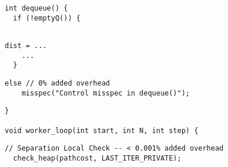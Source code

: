 

\begin{lstlisting}[morekeywords={pathcost,dist}, belowskip=0pt,
firstnumber=9, name=dij_checks, showlines=true]
int dequeue() {
  if (!emptyQ()) {


\end{lstlisting}

\begin{lstlisting}[morekeywords={pathcost,dist}, aboveskip=0pt, belowskip=0pt,
firstnumber=13, name=dij_checks]
    dist = ...
    ...
  }
\end{lstlisting}

  \begin{lstlisting}[morekeywords={pathcost}, aboveskip=0pt,belowskip=0pt,backgroundcolor=\color{lightgray}, firstnumber=auto, name=dij_checks]
  else // 0% added overhead
    misspec("Control misspec in dequeue()");
\end{lstlisting}

\begin{lstlisting}[morekeywords={pathcost,dist}, aboveskip=0pt, belowskip=0pt,
firstnumber=auto, name=dij_checks,showlines=true]
}

void worker_loop(int start, int N, int step) {

\end{lstlisting}

  \begin{lstlisting}[morekeywords={pathcost}, aboveskip=0pt,belowskip=0pt,backgroundcolor=\color{lightgray},
  firstnumber=auto, name=dij_checks,showlines=true]
  // Separation Local Check -- < 0.001% added overhead
  check_heap(pathcost, LAST_ITER_PRIVATE);
  \end{lstlisting}

